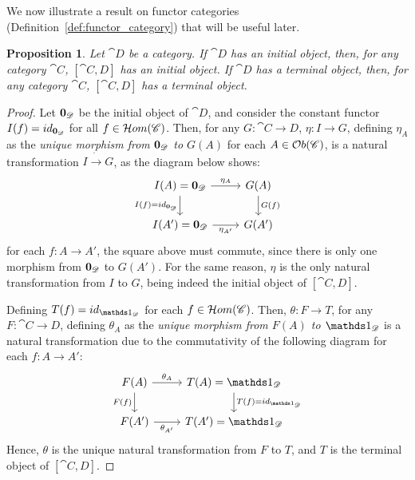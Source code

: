 \documentclass[a4paper, twoside,openright]{report}
\theoremstyle{plain}
\newtheorem{prop}[theorem]{Proposition}
\theoremstyle{definition}
\begin{document}
We now illustrate a result on functor categories (Definition~\ref{def:functor_category}) that will be useful later.

\begin{prop}
    Let $\cat D$ be a category. If $\cat D$ has an initial object, then, for any category $\cat C$, $[\cat{C, D}]$ has an initial object. If $\cat D$ has a terminal object, then, for any category $\cat C$, $[\cat{C, D}]$ has a terminal object.
\end{prop}

\begin{proof}
    Let $\textbf 0_{\mathscr{D}}$ be the initial object of $\cat D$,  and consider the constant functor $I(f) = id_{\textbf 0_{\mathscr{D}}}$ for all $f \in \mathcal{H}om(\mathscr{C})$. Then, for any $G: \cat{C \rightarrow D}$, $\eta: I \rightarrow G$, defining $\eta_A$ as the \emph{unique morphism from $\textbf 0_{\mathscr{D}}$ to $G(A)$} for each $A \in \mathcal{O}b(\mathscr{C})$, is a natural transformation $I \dot\rightarrow G$, as the diagram below shows:
    \[
        \begin{tikzcd}
            I(A)=\initial_{\cat D} 
                    \arrow[r, "{\eta_A}"]
                    \arrow[d, "{I(f) = id_{\initial_{\cat D}}}" swap] &
            G(A)
                    \arrow[d, "G(f)"] \\
            I(A') = \initial_{\cat D}
                    \arrow[r, "{\eta_{A'}}" swap] &
            G(A')
        \end{tikzcd}
    \]
    for each $f: A \rightarrow A'$, the square above must commute, since there is only one morphism from $\textbf 0_{\mathscr{D}}$ to $G(A')$. For the same reason, $\eta$ is the only natural transformation from $I$ to $G$, being indeed the initial object of $[\cat{C, D}]$.
    
    Defining $T(f) = id_{\terminal_{\cat D}}$ for each $f \in \mathcal{H}om(\mathscr{C})$. Then, $\theta:F\rightarrow T$, for any $F: \cat{C \rightarrow D}$, defining $\theta_A$ as the \emph{unique morphism from $F(A)$ to $\terminal_{\cat{D}}$} is a natural transformation due to the commutativity of the following diagram for each $f: A \rightarrow A'$:
    \[
        \begin{tikzcd}
            F(A) \arrow[r, "{\theta_A}"] \arrow[d, "F(f)" swap] &
            T(A) = \terminal_{\cat D} \arrow[d, "{T(f) = id_{\terminal_{\cat D}}}"] \\
            F(A') \arrow[r, "{\theta_{A'}}" swap] & T(A') = \terminal_{\cat D}
        \end{tikzcd}
    \]
    Hence, $\theta$ is the unique natural transformation from $F$ to $T$, and $T$ is the terminal object of $[\cat{C, D}]$.
\end{proof}
\end{document}
